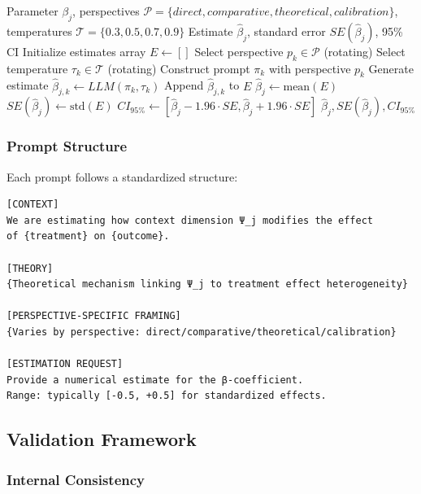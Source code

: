 \begin{algorithm}[H]
\caption{LLM Monte Carlo Estimation}
\begin{algorithmic}[1]
\REQUIRE Parameter $\beta_j$, perspectives $\mathcal{P} = \{direct, comparative, theoretical, calibration\}$, temperatures $\mathcal{T} = \{0.3, 0.5, 0.7, 0.9\}$
\ENSURE Estimate $\hat{\beta}_j$, standard error $SE(\hat{\beta}_j)$, 95\% CI
\STATE Initialize estimates array $E \leftarrow []$
    \STATE Select perspective $p_k \in \mathcal{P}$ (rotating)
    \STATE Select temperature $\tau_k \in \mathcal{T}$ (rotating)
    \STATE Construct prompt $\pi_k$ with perspective $p_k$
    \STATE Generate estimate $\hat{\beta}_{j,k} \leftarrow LLM(\pi_k, \tau_k)$
    \STATE Append $\hat{\beta}_{j,k}$ to $E$
\ENDFOR
\STATE $\hat{\beta}_j \leftarrow \text{mean}(E)$
\STATE $SE(\hat{\beta}_j) \leftarrow \text{std}(E)$
\STATE $CI_{95\%} \leftarrow [\hat{\beta}_j - 1.96 \cdot SE, \hat{\beta}_j + 1.96 \cdot SE]$
\RETURN $\hat{\beta}_j, SE(\hat{\beta}_j), CI_{95\%}$
\end{algorithmic}
\end{algorithm}

\subsubsection{Prompt Structure}

Each prompt follows a standardized structure:

\begin{verbatim}
[CONTEXT]
We are estimating how context dimension Ψ_j modifies the effect 
of {treatment} on {outcome}.

[THEORY]
{Theoretical mechanism linking Ψ_j to treatment effect heterogeneity}

[PERSPECTIVE-SPECIFIC FRAMING]
{Varies by perspective: direct/comparative/theoretical/calibration}

[ESTIMATION REQUEST]
Provide a numerical estimate for the β-coefficient.
Range: typically [-0.5, +0.5] for standardized effects.
\end{verbatim}

\subsection{Validation Framework}

\subsubsection{Internal Consistency}

